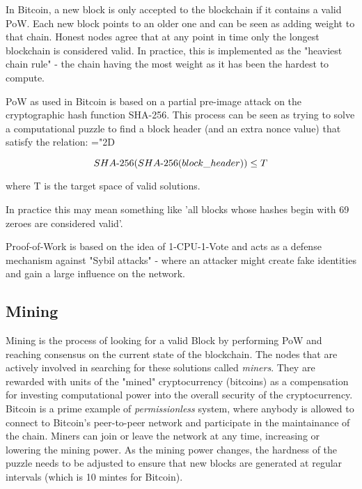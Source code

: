 In Bitcoin, a new block is only accepted to the blockchain if it contains a valid PoW.
Each new block points to an older one and can be seen as adding weight to that chain.
Honest nodes agree that at any point in time only the longest blockchain is considered valid. 
In practice, this is implemented as the "heaviest chain rule" - the chain having the most weight as it has been the hardest to compute.

PoW as used in Bitcoin is based on a partial pre-image attack on the cryptographic hash function SHA-256. 
This process can be seen as trying to solve a computational puzzle to find a block header (and an extra nonce value) that satisfy the relation: 
\mathchardef\mhyphen="2D

$$ SHA{\text -}256(SHA{\text -}256(block\_header)) \leq T $$

where T is the target space of valid solutions. 

In practice this may mean something like 'all blocks whose hashes begin with 69 zeroes are considered valid'.


Proof-of-Work is based on the idea of 1-CPU-1-Vote and acts as a defense mechanism against "Sybil attacks" - where an attacker might create fake identities and gain a large influence on the network. \cite{sybil}

\subsection{Mining} \label{btc-mining}

Mining is the process of looking for a valid Block by performing PoW and reaching consensus on the current state of the blockchain. 
The nodes that are actively involved in searching for these solutions called \textit{miners}. 
They are rewarded with units of the "mined" cryptocurrency (bitcoins) as a compensation for investing computational power into the overall security of the cryptocurrency. 
Bitcoin is a prime example of \textit{permissionless} system, where anybody is allowed to connect to Bitcoin's peer-to-peer network and participate in the maintainance of the chain.
Miners can join or leave the network at any time, increasing or lowering the mining power. 
As the mining power changes, the hardness of the puzzle needs to be adjusted to ensure that new blocks are generated at regular intervals (which is 10 mintes for Bitcoin). 

